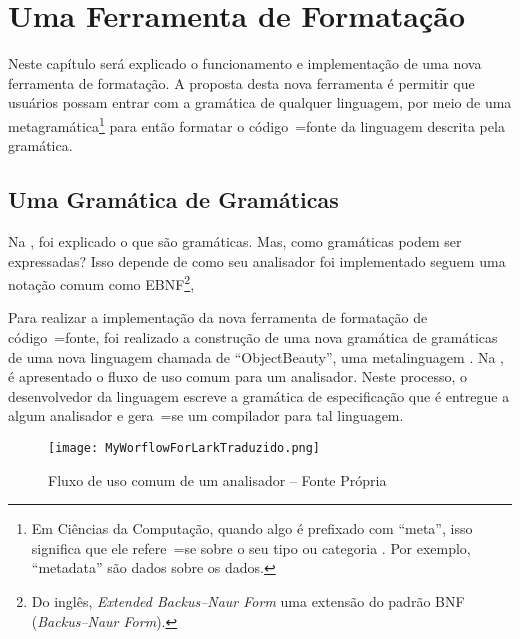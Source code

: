 

\chapter{Uma Ferramenta de Formatação}
\label{software_implementation}

Neste capítulo será explicado o funcionamento e
implementação de uma nova ferramenta de formatação.
A proposta desta nova ferramenta é permitir que usuários possam entrar com a gramática de qualquer linguagem,
por meio de uma metagramática\footnote{
Em Ciências da Computação,
quando algo é prefixado com ``meta'',
isso significa que ele refere~=se sobre o seu tipo ou
categoria \cite{theUseOfMetaRules}.
Por exemplo,
``metadata'' são dados sobre os dados.
} para então formatar o código~=fonte da linguagem descrita pela gramática.


\section{Uma Gramática de Gramáticas}
\label{GrammarsGrammar}

Na ,
foi explicado o que são gramáticas.
Mas,
como gramáticas podem ser expressadas?
Isso depende de como seu analisador foi implementado  seguem uma notação comum como EBNF\footnote{
Do inglês,
\textit{Extended Backus–Naur Form} uma extensão do padrão BNF (\textit{Backus–Naur Form}).
}\cite{teachingEbnf,antlrBookTerrentParr},

Para realizar a implementação da nova ferramenta de formatação de código~=fonte,
foi realizado a construção de uma nova gramática de gramáticas de uma nova linguagem chamada de ``ObjectBeauty'',
uma metalinguagem \cite{compilersCompilerMetaLanguage}.
Na ,
é apresentado o fluxo de uso comum para um analisador.
Neste processo,
o desenvolvedor da linguagem escreve a gramática de especificação que é entregue a algum analisador e
gera~=se um compilador para tal linguagem.
\begin{figure}[h]
\centering
\texttt{[image: MyWorflowForLarkTraduzido.png]}
\caption[Fluxo de uso comum de um analisador]{Fluxo de uso comum de um analisador -- Fonte Própria \cite{larkErrorRecovery}}
\label{MyWorflowForLarkTraduzido}
\end{figure}

